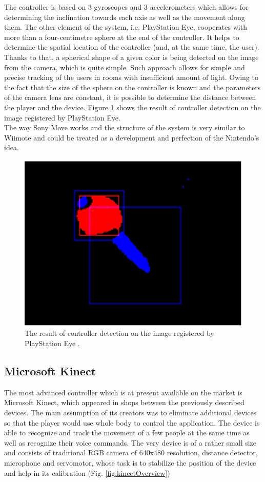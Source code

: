 \documentclass{jacsart}
\begin{document}
\indent The controller is based on 3 gyroscopes and 3 accelerometers which allows for determining the inclination towards each axis as well as the movement along them. The other element of the system, i.e. PlayStation Eye, cooperates with more than a four-centimetre sphere at the end of the controller. It helps to determine the spatial location of the controller (and, at the same time, the user). Thanks to that, a spherical shape of a given color is being detected on the image from the camera, which is quite simple. Such approach allows for simple and precise tracking of the users in rooms with insufficient amount of light. Owing to the fact that the size of the sphere on the controller is known and the parameters of the camera lens are constant, it is possible to determine the distance between the player and the device. Figure \ref{fig:moveResults} shows the result of controller detection on the image registered by PlayStation Eye.\\
\indent The way Sony Move works and the structure of the system is very similar to Wiimote and could be treated as a development and perfection of the Nintendo’s idea.\\

\begin{figure}[!t]
\centering
\includegraphics[width=0.5\linewidth]{SonyMoveCameraImage.jpg}
\caption{The result of controller detection on the image registered by PlayStation Eye \cite{Jr2011}.}
\label{fig:moveResults}
\end{figure}

\subsection{Microsoft Kinect} \label{ssec:kinect}

\indent The most advanced controller which is at present available on the market is Microsoft Kinect, which appeared in shops between the previously described devices. The main assumption of its creators was to eliminate additional devices so that the player would use whole body to control the application. The device is able to recognize and track the movement of a few people at the same time as well as recognize their voice commands. The very device is of a rather small size and consists of traditional RGB camera of 640x480 resolution, distance detector, microphone and servomotor, whose task is to stabilize the position of the device and help in its calibration (Fig. \ref{fig:kinectOverview})\\
\end{document}
